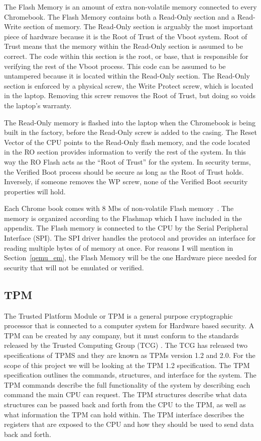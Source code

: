 \documentclass[../report.tex]{subfiles}
\begin{document}
The Flash Memory is an amount of extra non-volatile memory connected to every Chromebook. 
The Flash Memory contains both a Read-Only section and a Read-Write section of memory.
The Read-Only section is arguably the most important piece of hardware because it is the Root of Trust of the Vboot system.
Root of Trust means that the memory within the Read-Only section is assumed to be correct.
The code within this section is the root, or base, that is responsible for verifying the rest of the Vboot process.
This code can be assumed to be untampered because it is located within the Read-Only section.
The Read-Only section is enforced by a physical screw, the Write Protect screw, which is located in the laptop.
Removing this screw removes the Root of Trust, but doing so voids the laptop's warranty.

The Read-Only memory is flashed into the laptop when the Chromebook is being built in the factory, before the Read-Only screw is added to the casing. 
The Reset Vector of the CPU points to the Read-Only flash memory, and the code located in the RO section provides information to verify the rest of the system.
In this way the RO Flash acts as the ``Root of Trust'' for the system.
In security terms, the Verified Boot process should be secure as long as the Root of Trust holds.
Inversely, if someone removes the WP screw, none of the Verified Boot security properties will hold.

Each Chrome book comes with 8 Mbs of non-volatile Flash memory~\cite{fw-summit}.
The memory is organized according to the Flashmap which I have included in the appendix.
The Flash memory is connected to the CPU by the Serial Peripheral Interface (SPI).
The SPI driver handles the protocol and provides an interface for reading multiple bytes of of memory at once.
For reasons I will mention in Section~\ref{qemu_em}, the Flash Memory will be the one Hardware piece needed for security that will not be emulated or verified.

\subsection{TPM}

The Trusted Platform Module\cite{TPM} or TPM is a general purpose cryptographic processor that is connected to a computer system for Hardware based security.
A TPM can be created by any company, but it must conform to the standards released by the Trusted Computing Group (TCG) \cite{TCG}.
The TCG has released two specifications of TPMS and they are known as TPMs version 1.2 and 2.0.
For the scope of this project we will be looking at the TPM 1.2 specification.
The TPM specification outlines the commands, structures, and interface for the system.
The TPM commands describe the full functionality of the system by describing each command the main CPU can request.
The TPM structures describe what data structures can be passed back and forth from the CPU to the TPM, as well as what information the TPM can hold within.
The TPM interface describes the registers that are exposed to the CPU and how they should be used to send data back and forth.
\end{document}
